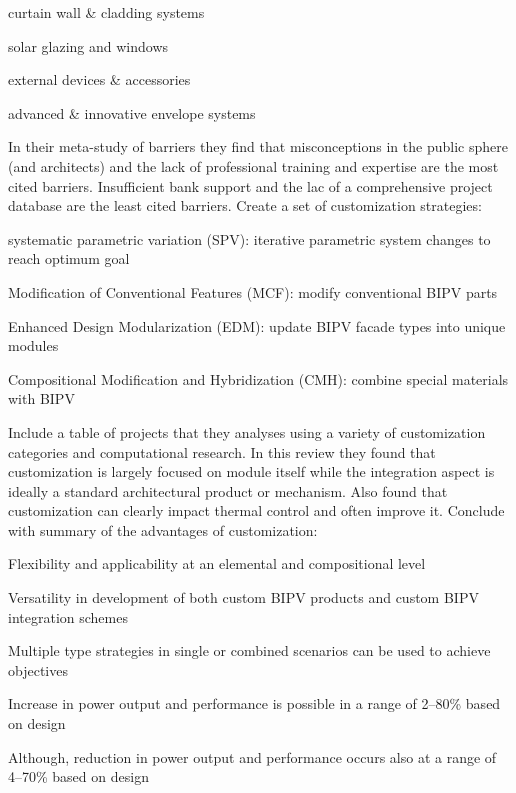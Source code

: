 \documentclass[11pt,a4paper]{article}
\newenvironment{itemize*}%
  {\begin{itemize}[rightmargin=\dimexpr\linewidth-120mm-\leftmargin\relax]%
    \setlength{\itemsep}{0pt}%
    \setlength{\parskip}{0pt}}%
  {\end{itemize}}
\begin{document}
\begin{itemize*}
    \item curtain wall \& cladding systems
    \item solar glazing and windows
    \item external devices \& accessories
    \item advanced \& innovative envelope systems
\end{itemize*}

In their meta-study of barriers they find that misconceptions in the public sphere (and architects) and the lack of professional training and expertise are the most cited barriers. Insufficient bank support and the lac of a comprehensive project database are the least cited barriers. Create a set of customization strategies:

\begin{itemize*}
    \item systematic parametric variation (SPV): iterative parametric system changes to reach optimum goal
    \item Modification of Conventional Features (MCF): modify conventional BIPV parts
    \item Enhanced Design Modularization (EDM): update BIPV facade types into unique modules
    \item Compositional Modification and Hybridization (CMH): combine special materials with BIPV
\end{itemize*}

Include a table of projects that they analyses using a variety of customization categories and computational research. In this review they found that customization is largely focused on module itself while the integration aspect is ideally a standard architectural product or mechanism. Also found that customization can clearly impact thermal control and often improve it. Conclude with summary of the advantages of customization:

\begin{itemize*}
    \item Flexibility and applicability at an elemental and compositional level
    \item Versatility in development of both custom BIPV products and custom BIPV integration schemes
    \item Multiple type strategies in single or combined scenarios can be used to achieve objectives
    \item Increase in power output and performance is possible in a range of 2–80\% based on design
    \item Although, reduction in power output and performance occurs also at a range of 4–70\% based on design
\end{itemize*}
\end{document}

